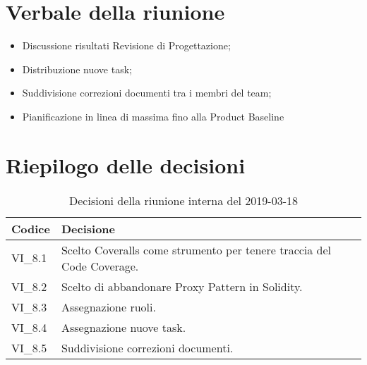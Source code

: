 \section{Verbale della riunione}
\begin{itemize}
	\item Discussione risultati Revisione di Progettazione;
	\item Distribuzione nuove task;
	\item Suddivisione correzioni documenti tra i membri del team;
	\item Pianificazione in linea di massima fino alla Product Baseline
	
\end{itemize}

\hspace{3cm}

\section{Riepilogo delle decisioni}

	
	\begin{longtable}{ >{\centering}p{} >{}p{}}
		\caption{Decisioni della riunione interna del 2019-03-18}\\	
		\rowcolorhead
		\textbf{\color{white}Codice} 
		& \centering\textbf{\color{white}Decisione} 
		\tabularnewline 
		\endfirsthead
		VI\_8.1 & Scelto Coveralls come strumento per tenere traccia del Code Coverage.
		\tabularnewline 
		VI\_8.2 & Scelto di abbandonare Proxy Pattern in Solidity.
		\tabularnewline 
		VI\_8.3 & Assegnazione ruoli.
		\tabularnewline 
		VI\_8.4 & Assegnazione nuove task.
		\tabularnewline
		VI\_8.5 & Suddivisione correzioni documenti.\\
		
	\end{longtable}
	




